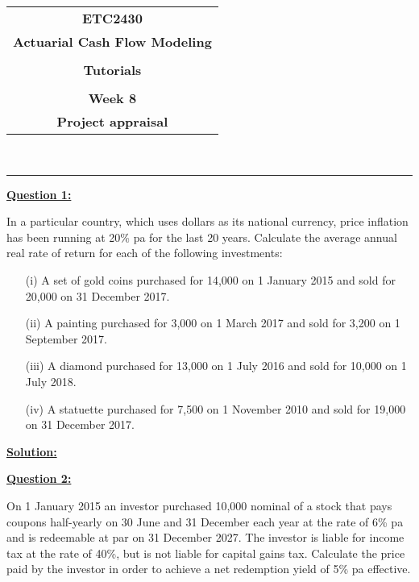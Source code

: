 \documentclass[11pt, answers]{exam}
\begin{document}
	
	\pagestyle{head}
	\firstpageheader{}{}{}
	\runningheadrule
	
	\begin{center}
		\begin{tabular}{c}
			\large{\textbf{ETC2430}}  \\
			\large{\textbf{Actuarial Cash Flow Modeling}} \\
			\\
			\textbf{Tutorials}\\
			\\
			\textbf{Week 8} \\
			\textbf{Project appraisal}
		\end{tabular}\\
	\end{center}
	\rule[1ex]{\textwidth}{.1pt}
	
\bigskip\bigskip

\underline{\textbf{Question 1:}}\bigskip

In a particular country, which uses dollars as its national currency, price inflation has been running at 20\% pa for the last 20 years. Calculate the average annual real rate of return for each of the following investments:
\begin{itemize}
\item[(i)] A set of gold coins purchased for 14,000 on 1 January 2015 and sold for 20,000 on 31 December 2017.
\item[(ii)] A painting purchased for 3,000 on 1 March 2017 and sold for 3,200 on 1 September 2017.
\item[(iii)] A diamond purchased for 13,000 on 1 July 2016 and sold for 10,000 on 1 July 2018.
\item[(iv)] A statuette purchased for 7,500 on 1 November 2010 and sold for 19,000 on 31 December 2017.
\end{itemize}
\bigskip\bigskip


\underline{\textbf{Solution:}}\bigskip


\bigskip\bigskip
\underline{\textbf{Question 2:}}\bigskip

On 1 January 2015 an investor purchased 10,000 nominal of a stock that pays coupons half-yearly on 30 June and 31 December each year at the rate of 6\% pa and is redeemable at par on 31 December 2027. The investor is liable for income tax at the rate of 40\%, but is not liable for capital gains tax. Calculate the price paid by the investor in order to achieve a net redemption yield of 5\% pa effective.
\bigskip\bigskip
\end{document}
